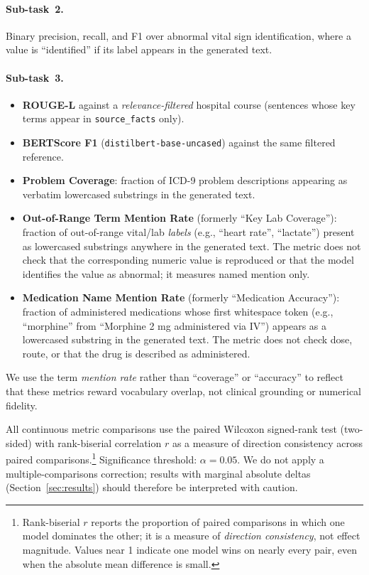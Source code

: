 \documentclass[sigconf,anonymous=false,review=false]{acmart}
\begin{document}
\paragraph{Sub-task~2.}
Binary precision, recall, and F1 over abnormal vital sign identification,
where a value is ``identified'' if its label appears in the generated text.

\paragraph{Sub-task~3.}
\begin{itemize}
  \item \textbf{ROUGE-L} against a \emph{relevance-filtered} hospital course
    (sentences whose key terms appear in \texttt{source\_facts} only).
  \item \textbf{BERTScore F1} (\texttt{distilbert-base-uncased}) against
    the same filtered reference.
  \item \textbf{Problem Coverage}: fraction of ICD-9 problem descriptions
    appearing as verbatim lowercased substrings in the generated text.
  \item \textbf{Out-of-Range Term Mention Rate} (formerly ``Key Lab
    Coverage''): fraction of out-of-range vital/lab \emph{labels} (e.g.,
    ``heart rate'', ``lactate'') present as lowercased substrings anywhere
    in the generated text. The metric does not check that the corresponding
    numeric value is reproduced or that the model identifies the value as
    abnormal; it measures named mention only.
  \item \textbf{Medication Name Mention Rate} (formerly ``Medication
    Accuracy''): fraction of administered medications whose first
    whitespace token (e.g., ``morphine'' from ``Morphine 2 mg administered
    via IV'') appears as a lowercased substring in the generated text. The
    metric does not check dose, route, or that the drug is described as
    administered.
\end{itemize}

We use the term \emph{mention rate} rather than ``coverage'' or ``accuracy''
to reflect that these metrics reward vocabulary overlap, not clinical
grounding or numerical fidelity.

All continuous metric comparisons use the paired Wilcoxon signed-rank test
(two-sided) with rank-biserial correlation $r$ as a measure of direction
consistency across paired comparisons.\footnote{Rank-biserial $r$ reports
the proportion of paired comparisons in which one model dominates the other;
it is a measure of \emph{direction consistency}, not effect magnitude. Values
near 1 indicate one model wins on nearly every pair, even when the absolute
mean difference is small.} Significance threshold: $\alpha = 0.05$. We do
not apply a multiple-comparisons correction; results with marginal absolute
deltas (Section~\ref{sec:results}) should therefore be interpreted with
caution.
\end{document}
